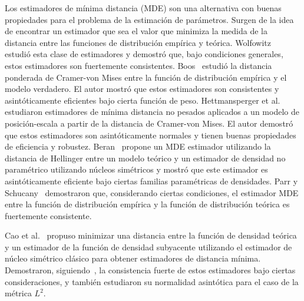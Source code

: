 Los estimadores de mínima distancia (MDE) son una  alternativa con buenas propiedades para el problema de la estimación de parámetros.
Surgen de la idea de encontrar un estimador que sea el valor que minimiza la medida de la distancia entre las funciones de distribución empírica y teórica.
Wolfowitz~\cite{wolfowitz1953, wolfowitz1957} estudió esta clase de estimadores y demostró que, bajo condiciones generales, estos estimadores son fuertemente consistentes. 
Boos~\cite{Boos1981} estudió la distancia ponderada de Cramer-von Mises entre la función de distribución empírica y el modelo verdadero.
El autor mostró que estos estimadores son consistentes y asintóticamente eficientes bajo cierta función de peso.
Hettmansperger et al.~\cite{HettmanSperger1994} estudiaron estimadores de mínima distancia no pesados aplicados a un modelo de posición-escala a partir de la distancia de Cramer-von Mises. El autor demostró que estos estimadores son asintóticamente normales y tienen buenas propiedades de eficiencia y robustez.
Beran~\cite{beran1977} propone un MDE estimador utilizando la distancia de Hellinger entre un modelo teórico y un estimador de densidad no paramétrico utilizando núcleos simétricos y mostró que este estimador es asintóticamente eficiente bajo ciertas familias paramétricas de densidades.
Parr y Schucany~\cite{parr1982} demostraron que, considerando ciertas condiciones, el estimador MDE entre la función de distribución empírica y la función de distribución teórica es fuertemente consistente.

Cao et al.~\cite{cao1995minimum} propuso minimizar una distancia entre la función de densidad teórica y un estimador de la función de densidad subyacente utilizando el estimador de núcleo simétrico clásico para obtener estimadores de distancia mínima. Demostraron, siguiendo~\cite{parr1982}, la consistencia fuerte de estos estimadores bajo ciertas consideraciones, y también estudiaron su normalidad asintótica para el caso de la métrica $ L^2 $.



